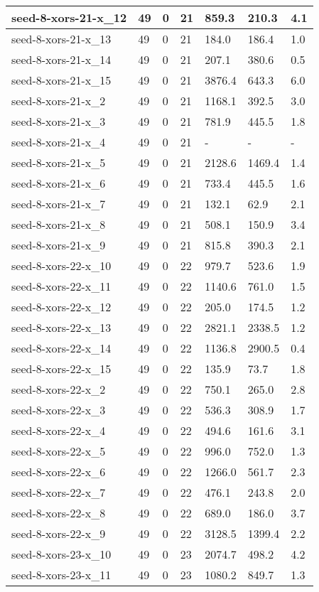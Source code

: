 \begin{scriptsize}
\begin{longtable}{|p{5cm}|l|l|l|l|l|l|}
seed-8-xors-21-x\_12&49&0&21&859.3&210.3&4.1 \\ \hline 
seed-8-xors-21-x\_13&49&0&21&184.0&186.4&1.0 \\ \hline 
seed-8-xors-21-x\_14&49&0&21&207.1&380.6&0.5 \\ \hline 
seed-8-xors-21-x\_15&49&0&21&3876.4&643.3&6.0 \\ \hline 
seed-8-xors-21-x\_2&49&0&21&1168.1&392.5&3.0 \\ \hline 
seed-8-xors-21-x\_3&49&0&21&781.9&445.5&1.8 \\ \hline 
seed-8-xors-21-x\_4&49&0&21&-&-&- \\ \hline 
seed-8-xors-21-x\_5&49&0&21&2128.6&1469.4&1.4 \\ \hline 
seed-8-xors-21-x\_6&49&0&21&733.4&445.5&1.6 \\ \hline 
seed-8-xors-21-x\_7&49&0&21&132.1&62.9&2.1 \\ \hline 
seed-8-xors-21-x\_8&49&0&21&508.1&150.9&3.4 \\ \hline 
seed-8-xors-21-x\_9&49&0&21&815.8&390.3&2.1 \\ \hline 
seed-8-xors-22-x\_10&49&0&22&979.7&523.6&1.9 \\ \hline 
seed-8-xors-22-x\_11&49&0&22&1140.6&761.0&1.5 \\ \hline 
seed-8-xors-22-x\_12&49&0&22&205.0&174.5&1.2 \\ \hline 
seed-8-xors-22-x\_13&49&0&22&2821.1&2338.5&1.2 \\ \hline 
seed-8-xors-22-x\_14&49&0&22&1136.8&2900.5&0.4 \\ \hline 
seed-8-xors-22-x\_15&49&0&22&135.9&73.7&1.8 \\ \hline 
seed-8-xors-22-x\_2&49&0&22&750.1&265.0&2.8 \\ \hline 
seed-8-xors-22-x\_3&49&0&22&536.3&308.9&1.7 \\ \hline 
seed-8-xors-22-x\_4&49&0&22&494.6&161.6&3.1 \\ \hline 
seed-8-xors-22-x\_5&49&0&22&996.0&752.0&1.3 \\ \hline 
seed-8-xors-22-x\_6&49&0&22&1266.0&561.7&2.3 \\ \hline 
seed-8-xors-22-x\_7&49&0&22&476.1&243.8&2.0 \\ \hline 
seed-8-xors-22-x\_8&49&0&22&689.0&186.0&3.7 \\ \hline 
seed-8-xors-22-x\_9&49&0&22&3128.5&1399.4&2.2 \\ \hline 
seed-8-xors-23-x\_10&49&0&23&2074.7&498.2&4.2 \\ \hline 
seed-8-xors-23-x\_11&49&0&23&1080.2&849.7&1.3 \\ \hline 

\end{longtable}
\end{scriptsize}
